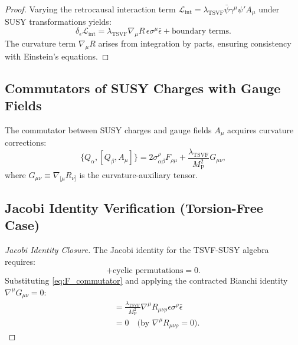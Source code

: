 \documentclass[12pt, onecolumn]{article}
\theoremstyle{definition}
\newcommand{\tsvf}{\lambda_{\mathrm{TSVF}}}
\newcommand{\Mp}{M_{\mathrm{P}}}
\numberwithin{equation}{section}
\begin{document}
\begin{proof}
Varying the retrocausal interaction term \(\mathcal{L}_{\text{int}} = \tsvf \bar{\psi} \gamma^\mu \psi' A_\mu\) under SUSY transformations yields:
\begin{equation}
\delta_\epsilon \mathcal{L}_{\text{int}} = \tsvf \nabla_\mu R \, \epsilon \sigma^\mu \bar{\epsilon} + \text{boundary terms}.
\label{eq:L_variation}
\end{equation}
The curvature term \(\nabla_\mu R\) arises from integration by parts, ensuring consistency with Einstein's equations. \qedhere
\end{proof}

\subsection{Commutators of SUSY Charges with Gauge Fields} 
\label{subsec:gauge_commutators}

The commutator between SUSY charges and gauge fields \(A_\mu\) acquires curvature corrections:
\begin{equation}
\{ Q_\alpha, [Q_\beta, A_\mu] \} = 2 \sigma^\rho_{\alpha\beta} F_{\rho\mu} + \frac{\tsvf}{\Mp^2} G_{\mu\nu},
\label{eq:F_commutator}
\end{equation}
where \(G_{\mu\nu} \equiv \nabla_{[\mu} R_{\nu]}\) is the curvature-auxiliary tensor.  

\subsection{Jacobi Identity Verification (Torsion-Free Case)} 
\label{subsec:Jacobi_torsion_free}

\begin{proof}[Jacobi Identity Closure]
The Jacobi identity for the TSVF-SUSY algebra requires:
\begin{equation}
[Q_\alpha, \{ Q_\beta, A_\mu \}] + \text{cyclic permutations} = 0.
\label{eq:Jacobi_condition}
\end{equation}
Substituting \eqref{eq:F_commutator} and applying the contracted Bianchi identity \(\nabla^\mu G_{\mu\nu} = 0\):
\begin{align}
[Q_\alpha, \frac{\tsvf}{\Mp^2} G_{\mu\nu}] &= \frac{\tsvf}{\Mp^2} \nabla^\mu R_{\mu\nu\rho} \epsilon \sigma^\rho \bar{\epsilon} \nonumber \\
&= 0 \quad \text{(by \(\nabla^\mu R_{\mu\nu\rho} = 0\))}.
\label{eq:Jacobi_cancel}
\end{align}
\end{proof}
\end{document}
